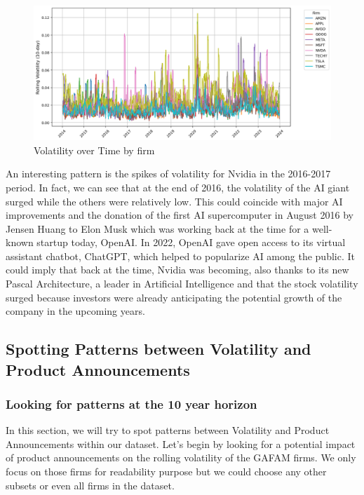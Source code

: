 \documentclass[12pt, oneside]{article}
\begin{document}
\begin{figure}[H]
    \centering
    \includegraphics[width=0.8\linewidth]{volatility_analysis.png}
    \caption{Volatility over Time by firm}
    \label{fig:volatility_analysis}
\end{figure}

An interesting pattern is the spikes of volatility for Nvidia in the 2016-2017 period. In fact, we can see that at the end of 2016, the volatility of the AI giant surged while the others were relatively low. This could coincide with major AI improvements and the donation of the first AI supercomputer in August 2016 by Jensen Huang to Elon Musk which was working back at the time for a well-known startup today, OpenAI. In 2022, OpenAI gave open access to its virtual assistant chatbot, ChatGPT, which helped to popularize AI among the public. It could imply that back at the time, Nvidia was becoming, also thanks to its new Pascal Architecture, a leader in Artificial Intelligence and that the stock volatility surged because investors were already anticipating the potential growth of the company in the upcoming years.

\subsection{Spotting Patterns between Volatility and Product Announcements}

\subsubsection{Looking for patterns at the 10 year horizon}
In this section, we will try to spot patterns between Volatility and Product Announcements within our dataset. Let's begin by looking for a potential impact of product announcements on the rolling volatility of the GAFAM firms. We only focus on those firms for readability purpose but we could choose any other subsets or even all firms in the dataset.
\end{document}

